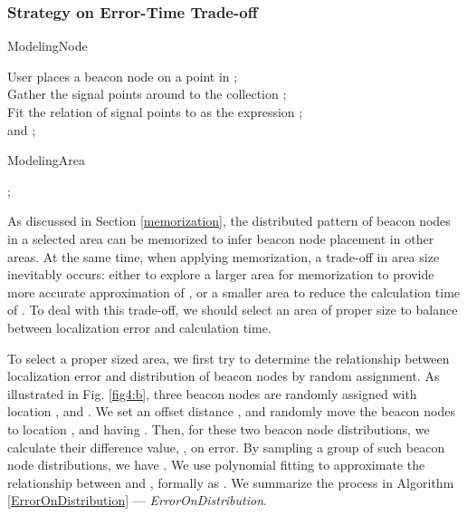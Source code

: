 \documentclass[10pt, conference, letterpaper]{IEEEtran}
\begin{document}
\subsubsection{Strategy on Error-Time Trade-off}

\begin{algorithm} \label{ModelingNode}
\caption{ModelingNode}
User places a beacon node  on a point  in ;\\
Gather the signal points around  to the collection ;\\
Fit the relation of signal points to  as the expression ;\\
\Return  and ;
\end{algorithm}

\begin{algorithm} \label{ModelingArea}
\caption{ModelingArea}
\Return ;
\end{algorithm}

As discussed in Section \ref{memorization}, the distributed pattern of beacon nodes in a selected area can be memorized to infer beacon node placement in other areas. At the same time, when applying memorization, a trade-off in area size inevitably occurs: either to explore a larger area for memorization to provide more accurate approximation of , or a smaller area to reduce the calculation time of . To deal with this trade-off, we should select an area of proper size to balance between localization error and calculation time.

To select a proper sized area, we first try to determine the relationship between localization error and distribution of beacon nodes by random assignment. As illustrated in Fig. \ref{fig4:b}, three beacon nodes are randomly assigned with location ,  and . We set an offset distance , and randomly move the beacon nodes to location ,  and  having . Then, for these two beacon node distributions, we calculate their difference value, , on error. By sampling a group of such beacon node distributions, we have . We use polynomial fitting to approximate the relationship between  and , formally as . We summarize the process in Algorithm \ref{ErrorOnDistribution} --- \textit{ErrorOnDistribution}.
\end{document}
